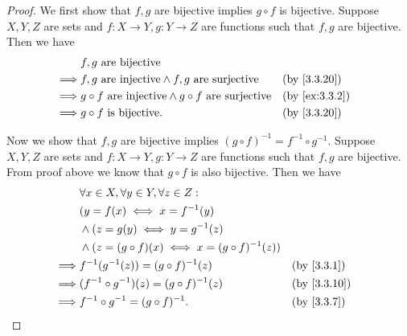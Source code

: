 \begin{proof}
  We first show that \(f, g\) are bijective implies \(g \circ f\) is bijective.
  Suppose \(X, Y, Z\) are sets and \(f : X \to Y, g : Y \to Z\) are functions such that \(f, g\) are bijective.
  Then we have
  \begin{align*}
             & f, g \text{ are bijective}                                                                \\
    \implies & f, g \text{ are injective} \land f, g \text{ are surjective}           &  & \by{3.3.20}   \\
    \implies & g \circ f \text{ are injective} \land g \circ f \text{ are surjective} &  & \by{ex:3.3.2} \\
    \implies & g \circ f \text{ is bijective}.                                        &  & \by{3.3.20}
  \end{align*}

  Now we show that \(f, g\) are bijective implies \((g \circ f)^{-1} = f^{-1} \circ g^{-1}\).
  Suppose \(X, Y, Z\) are sets and \(f : X \to Y, g : Y \to Z\) are functions such that \(f, g\) are bijective.
  From proof above we know that \(g \circ f\) is also bijective.
  Then we have
  \begin{align*}
             & \forall x \in X, \forall y \in Y, \forall z \in Z :                      \\
             & (y = f(x) \iff x = f^{-1}(y)                                             \\
             & \land (z = g(y) \iff y = g^{-1}(z)                                       \\
             & \land (z = (g \circ f)(x) \iff x = (g \circ f)^{-1}(z))                  \\
    \implies & f^{-1}(g^{-1}(z)) = (g \circ f)^{-1}(z)                 &  & \by{3.3.1}  \\
    \implies & (f^{-1} \circ g^{-1})(z) = (g \circ f)^{-1}(z)          &  & \by{3.3.10} \\
    \implies & f^{-1} \circ g^{-1} = (g \circ f)^{-1}.                 &  & \by{3.3.7}
  \end{align*}
\end{proof}

